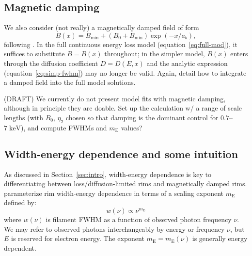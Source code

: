 \documentclass[iop, apj, numberedappendix, twocolappendix]{emulateapj}
\newcommand*{\mt}{\mathrm}
\newcommand*{\unit}[1]{\;\mt{#1}}  %
\newcommand*{\mE}{m_\mt{E}}
\begin{document}
\subsection{Magnetic damping}

We also consider (not really) a magnetically damped field of form
\begin{equation}
    B(x) = B_{\mt{min}} + \left(B_0 + B_{\mt{min}}\right) \exp\left(-x / a_b\right) ,
\end{equation}
following \citet{pohl2005}.
In the full continuous energy loss model (equation~\eqref{eq:full-mod}), it
suffices to substitute $B = B(x)$ throughout; in the simpler model, $B(x)$
enters through the diffusion coefficient $D = D(E,x)$ and the analytic
expression (equation~\eqref{eq:simp-fwhm}) may no longer be valid.
Again,  detail how to integrate a damped field into the
full model solutions.

(DRAFT) We currently do not present model fits with magnetic damping, although
in principle they are doable.  Set up the calculation w/ a range of scale
lengths (with $B_0$, $\eta_2$ chosen so that damping is the dominant control
for $0.7$--$7 \unit{keV}$), and compute FWHMs and $\mE$ values?

\subsection{Width-energy dependence and some intuition} \label{sec:energydep}

As discussed in Section~\ref{sec:intro}, width-energy dependence is key to
differentiating between loss/diffusion-limited rims and magnetically damped
rims.   parameterize rim width-energy dependence in
terms of a scaling exponent $\mE$ defined by:
\begin{equation}
    w(\nu) \propto \nu^{\mE}
\end{equation}
where $w(\nu)$ is filament FWHM as a function of observed photon frequency
$\nu$.  We may refer to observed photons interchangeably by energy or frequency
$\nu$, but $E$ is reserved for electron energy.  The exponent $\mE = \mE(\nu)$
is generally energy dependent.
\end{document}
